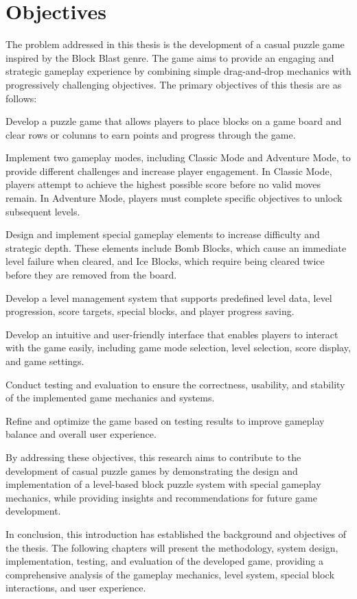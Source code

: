 \documentclass[a4paper,12pt]{report}
\begin{document}
\section{Objectives}

The problem addressed in this thesis is the development of a casual puzzle game inspired by the Block Blast genre. The game aims to provide an engaging and strategic gameplay experience by combining simple drag-and-drop mechanics with progressively challenging objectives. The primary objectives of this thesis are as follows:

Develop a puzzle game that allows players to place blocks on a game board and clear rows or columns to earn points and progress through the game.

Implement two gameplay modes, including Classic Mode and Adventure Mode, to provide different challenges and increase player engagement. In Classic Mode, players attempt to achieve the highest possible score before no valid moves remain. In Adventure Mode, players must complete specific objectives to unlock subsequent levels.

Design and implement special gameplay elements to increase difficulty and strategic depth. These elements include Bomb Blocks, which cause an immediate level failure when cleared, and Ice Blocks, which require being cleared twice before they are removed from the board.

Develop a level management system that supports predefined level data, level progression, score targets, special blocks, and player progress saving.

Develop an intuitive and user-friendly interface that enables players to interact with the game easily, including game mode selection, level selection, score display, and game settings.

Conduct testing and evaluation to ensure the correctness, usability, and stability of the implemented game mechanics and systems.

Refine and optimize the game based on testing results to improve gameplay balance and overall user experience.

By addressing these objectives, this research aims to contribute to the development of casual puzzle games by demonstrating the design and implementation of a level-based block puzzle system with special gameplay mechanics, while providing insights and recommendations for future game development.

In conclusion, this introduction has established the background and objectives of the thesis. The following chapters will present the methodology, system design, implementation, testing, and evaluation of the developed game, providing a comprehensive analysis of the gameplay mechanics, level system, special block interactions, and user experience.
\end{document}
